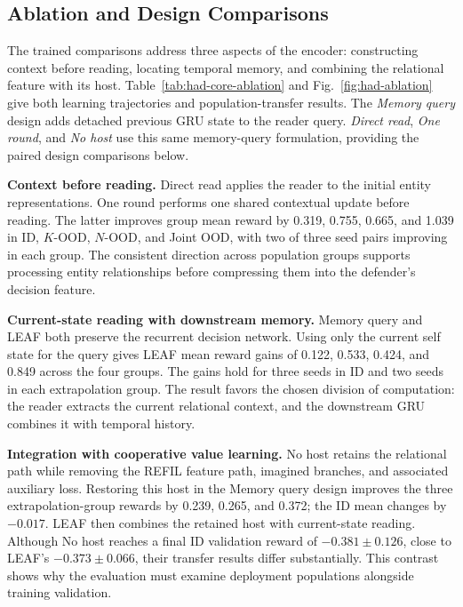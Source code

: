 \subsection{Ablation and Design Comparisons}
\label{subsec:ablation}
The trained comparisons address three aspects of the encoder: constructing context before reading, locating temporal memory, and combining the relational feature with its host. Table~\ref{tab:had-core-ablation} and Fig.~\ref{fig:had-ablation} give both learning trajectories and population-transfer results. The \emph{Memory query} design adds detached previous GRU state to the reader query. \emph{Direct read}, \emph{One round}, and \emph{No host} use this same memory-query formulation, providing the paired design comparisons below.

\noindent\textbf{Context before reading.}
Direct read applies the reader to the initial entity representations. One round performs one shared contextual update before reading. The latter improves group mean reward by 0.319, 0.755, 0.665, and 1.039 in ID, $K$-OOD, $N$-OOD, and Joint OOD, with two of three seed pairs improving in each group. The consistent direction across population groups supports processing entity relationships before compressing them into the defender's decision feature.

\noindent\textbf{Current-state reading with downstream memory.}
Memory query and LEAF both preserve the recurrent decision network. Using only the current self state for the query gives LEAF mean reward gains of 0.122, 0.533, 0.424, and 0.849 across the four groups. The gains hold for three seeds in ID and two seeds in each extrapolation group. The result favors the chosen division of computation: the reader extracts the current relational context, and the downstream GRU combines it with temporal history.

\noindent\textbf{Integration with cooperative value learning.}
No host retains the relational path while removing the REFIL feature path, imagined branches, and associated auxiliary loss. Restoring this host in the Memory query design improves the three extrapolation-group rewards by 0.239, 0.265, and 0.372; the ID mean changes by $-0.017$. LEAF then combines the retained host with current-state reading. Although No host reaches a final ID validation reward of $-0.381\pm0.126$, close to LEAF's $-0.373\pm0.066$, their transfer results differ substantially. This contrast shows why the evaluation must examine deployment populations alongside training validation.

